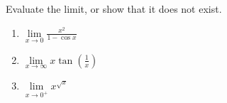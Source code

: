 Evaluate the limit, or show that it does not exist.

\begin{multicols}{2}
\begin{enumerate}
\item $\lim\limits_{x\to 0}\frac{x^2}{1-\cos x} $
\item $\lim\limits_{x\to\infty}x \tan \left(\frac{1}{x}\right) $
\item $\lim \limits_{x\to 0^+}x^{\sqrt{x}}$
\end{enumerate}
\end{multicols}